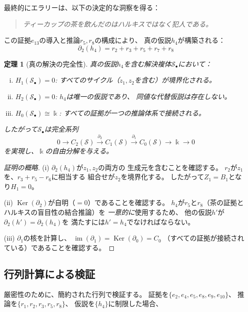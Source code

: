 \documentclass[12pt,twocolumn]{ltjsarticle}
\newtheorem{theorem}{定理}[section]
\newcommand{\im}{\operatorname{im}}
\newcommand{\Ker}{\operatorname{Ker}}
\newcommand{\Sol}{\mathcal{S}}
\newcommand{\kk}{\Bbbk}
\begin{document}
最終的にエラリーは、以下の決定的な洞察を得る：
\begin{quote}
\emph{ティーカップの茶を飲んだのはハルキスではなく犯人である。}
\end{quote}
この証拠$e_{13}$の導入と推論$r_5, r_8$の構成により、
真の仮説$h_4$が構築される：
\begin{equation}
\partial_2(h_4) = r_2 + r_3 + r_5 + r_7 + r_8
\end{equation}

\begin{theorem}[真の解決の完全性]
\label{thm:true_solution}
真の仮説$h_4$を含む解決複体$\Sol_\bullet$において：
\begin{enumerate}[(i)]
\item $H_1(\Sol_\bullet) = 0$:
すべてのサイクル（$z_1, z_2$を含む）が境界化される。
\item $H_2(\Sol_\bullet) = 0$:
$h_4$は唯一の仮説であり、
同値な代替仮説は存在しない。
\item $H_0(\Sol_\bullet) \cong \kk$:
すべての証拠が一つの推論体系で接続される。
\end{enumerate}
したがって$\Sol_\bullet$は完全系列
\begin{equation}
0 \to C_2(\Sol) \xrightarrow{\partial_2} C_1(\Sol)
\xrightarrow{\partial_1} C_0(\Sol) \to \kk \to 0
\end{equation}
を実現し、$\kk$の自由分解を与える。
\end{theorem}

\begin{proof}[証明の概略]
(i) $\partial_2(h_4)$が$z_1, z_2$の両方の
生成元を含むことを確認する。
$r_2$が$z_1$を、$r_3 + r_5 - r_6$に相当する
組合せが$z_2$を境界化する。
したがって$Z_1 = B_1$となり$H_1 = 0$。

(ii) $\Ker(\partial_2)$が自明（$= 0$）であることを確認する。
$h_4$が$r_5$と$r_8$（茶の証拠とハルキスの盲目性の結合推論）を
\emph{一意的に}使用するため、
他の仮説$h'$が$\partial_2(h') = \partial_2(h_4)$を
満たすには$h' = h_4$でなければならない。

(iii) $\partial_1$の核を計算し、
$\im(\partial_1) = \Ker(\partial_0) = C_0$
（すべての証拠が接続されている）であることを確認する。
\end{proof}


\subsection{行列計算による検証}

厳密性のために、簡約された行列で検証する。
証拠を$\{e_2, e_4, e_5, e_8, e_9, e_{10}\}$、
推論を$\{r_1, r_2, r_3, r_5, r_8\}$、
仮説を$\{h_4\}$に制限した場合、
\end{document}
